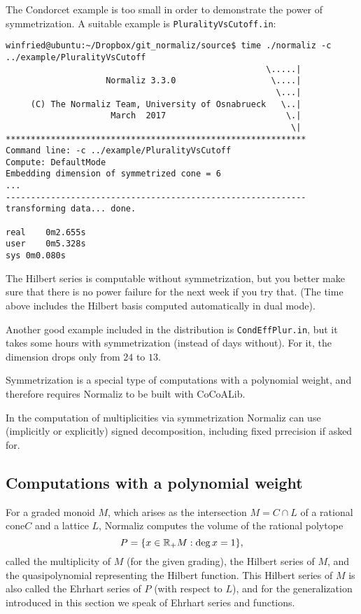 The Condorcet example is too small in order to demonstrate the power of symmetrization. A suitable example is \verb|PluralityVsCutoff.in|:
\begin{Verbatim}
winfried@ubuntu:~/Dropbox/git_normaliz/source$ time ./normaliz -c ../example/PluralityVsCutoff
                                                    \.....|
                    Normaliz 3.3.0                   \....|
                                                      \...|
     (C) The Normaliz Team, University of Osnabrueck   \..|
                     March  2017                        \.|
                                                         \|
************************************************************
Command line: -c ../example/PluralityVsCutoff 
Compute: DefaultMode 
Embedding dimension of symmetrized cone = 6
...
------------------------------------------------------------
transforming data... done.

real	0m2.655s
user	0m5.328s
sys	0m0.080s
\end{Verbatim}
The Hilbert series is computable without symmetrization, but you better make sure that there is no power failure for the next week if you try that. (The time above includes the Hilbert basis computed automatically in dual mode).

Another good example included in the distribution is \verb|CondEffPlur.in|, but it takes some hours with symmetrization (instead of days without). For it, the dimension drops only from $24$ to $13$.

Symmetrization is a special type of computations with a polynomial weight, and therefore requires Normaliz to be built with CoCoALib.

In the computation of multiplicities via symmetrization Normaliz can use (implicitly or explicitly) signed decomposition, including fixed prrecision if asked for.

\subsection{Computations with a polynomial weight}\label{Poly_comp}

For a graded monoid $M$, which arises as the intersection $M=C\cap L$ of a rational cone$C$ and a lattice $L$, Normaliz computes the volume of
the rational polytope
$$
P=\{x\in {\mathbb R}_+ M: \deg x=1\},
$$
called the multiplicity of $M$ (for the given grading), the Hilbert series of $M$, and the quasipolynomial representing the Hilbert function. This Hilbert series of $M$ is also called the Ehrhart series of $P$ (with respect to $L$), and for the generalization introduced in this section we speak of Ehrhart series and functions.

